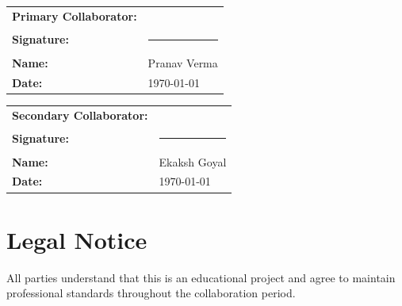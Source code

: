\documentclass[12pt,a4paper]{article}
\begin{document}
\vspace{1cm}

\begin{tabular}{ll}
\textbf{Primary Collaborator:} & \\
\textbf{Signature:} & \rule{5cm}{0.4pt} \\
\textbf{Name:} & Pranav Verma \\
\textbf{Date:} & \today \\
\end{tabular}

\vspace{1cm}

\begin{tabular}{ll}
\textbf{Secondary Collaborator:} & \\
\textbf{Signature:} & \rule{5cm}{0.4pt} \\
\textbf{Name:} & Ekaksh Goyal \\
\textbf{Date:} & \today \\
\end{tabular}

\vspace{1cm}

\section*{Legal Notice}

All parties understand that this is an educational project and agree to maintain professional standards throughout the collaboration period.
\end{document}
